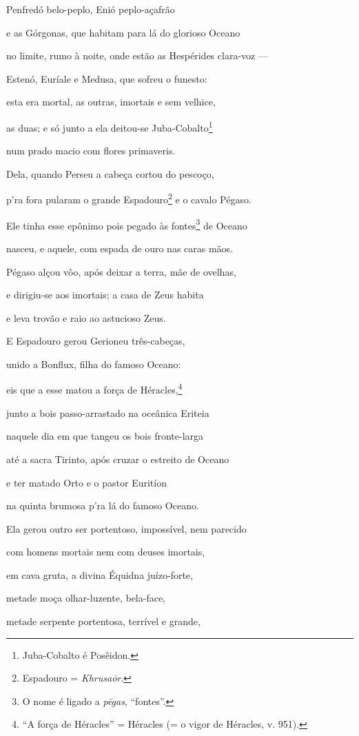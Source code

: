 \begin{pages}
\begin{Rightside}
Penfredó belo-peplo, Enió peplo-açafrão

e as Górgonas, que habitam para lá do glorioso Oceano

no limite, rumo à noite, onde estão as Hespérides clara-voz --- 

Estenó, Euríale e Medusa, que sofreu o funesto:

esta era mortal, as outras, imortais e sem velhice,

as duas; e só junto a ela deitou-se Juba-Cobalto\footnote{Juba-Cobalto é Posêidon.}

num prado macio com flores primaveris.

Dela, quando Perseu a cabeça cortou do pescoço, 

p'ra fora pularam o grande Espadouro\footnote{Espadouro = \emph{Khrusaōr}.} e o cavalo Pégaso.

Ele tinha esse epônimo pois pegado às fontes\footnote{O nome é ligado a \emph{pēgas}, ``fontes''.} de Oceano

nasceu, e aquele, com espada de ouro nas caras mãos.

Pégaso alçou vôo, após deixar a terra, mãe de ovelhas,

e dirigiu-se aos imortais; a casa de Zeus habita 

e leva trovão e raio ao astucioso Zeus.

E Espadouro gerou Gerioneu três-cabeças,

unido a Bonflux, filha do famoso Oceano:

eis que a esse matou a força de Héracles,\footnote{``A força de Héracles'' = Héracles (= o vigor de Héracles, v. 951).}

junto a bois passo-arrastado na oceânica Eriteia 

naquele dia em que tangeu os bois fronte-larga

até a sacra Tirinto, após cruzar o estreito de Oceano

e ter matado Orto e o pastor Euritíon

na quinta brumosa p'ra lá do famoso Oceano.

\quad{}Ela gerou outro ser portentoso, impossível, nem parecido 

com homens mortais nem com deuses imortais,

em cava gruta, a divina Équidna juízo-forte,

metade moça olhar-luzente, bela-face,

metade serpente portentosa, terrível e grande,


\end{Rightside}
\end{pages}
